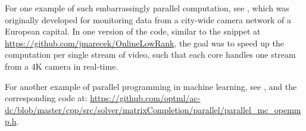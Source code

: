 For one example of such embarrassingly parallel computation, see 
\cite{akhriev2018pursuit}, which was originally developed 
for monitoring data from a city-wide camera network of a European capital. 
In one version of the code, similar to the snippet at  \url{https://github.com/jmarecek/OnlineLowRank},
the goal was to speed up the computation per single stream of video, such that each core handles one stream from a 4K camera in real-time. 

For another example of parallel programming in machine learning, see
\cite{marevcek2015distributed}, and the corresponding code at:
\url{https://github.com/optml/ac-dc/blob/master/cpp/src/solver/matrixCompletion/parallel/parallel_mc_opemmp.h}.

